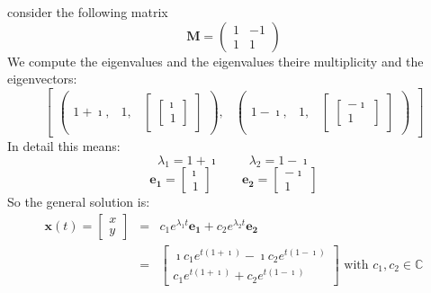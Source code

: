           consider the following matrix 
          \[
 \mathbf{M}=\left(\begin{matrix}1 & -1\\1 & 1\end{matrix}\right)\]          We compute the eigenvalues and the eigenvalues theire multiplicity and the eigenvectors:
          \[
\begin{bmatrix}\begin{pmatrix}1 + \mathbf{\imath}, & 1, & \begin{bmatrix}\left[\begin{smallmatrix}\mathbf{\imath}\\1\end{smallmatrix}\right]\end{bmatrix}\end{pmatrix}, & \begin{pmatrix}1 - \mathbf{\imath}, & 1, & \begin{bmatrix}\left[\begin{smallmatrix}- \mathbf{\imath}\\1\end{smallmatrix}\right]\end{bmatrix}\end{pmatrix}\end{bmatrix}\]          In detail this means:
          \[
\lambda_1=1 + \mathbf{\imath}\hspace{1cm}\lambda_2=1 - \mathbf{\imath}\]\[
\mathbf{e_1}=\left[\begin{smallmatrix}\mathbf{\imath}\\1\end{smallmatrix}\right]\hspace{1cm}\mathbf{e_2}=\left[\begin{smallmatrix}- \mathbf{\imath}\\1\end{smallmatrix}\right]\]          So the general solution is:
\begin{eqnarray}
\mathbf{x}(t)=\left[\begin{smallmatrix}x\\y\end{smallmatrix}\right]&=&c_1 e^{\lambda_1 t}\mathbf{e_1}+c_2 e^{\lambda_2 t}\mathbf{e_2} \nonumber \\&=&\left[\begin{smallmatrix}\mathbf{\imath} c_{1} e^{t \left(1 + \mathbf{\imath}\right)} - \mathbf{\imath} c_{2} e^{t \left(1 - \mathbf{\imath}\right)}\\c_{1} e^{t \left(1 + \mathbf{\imath}\right)} + c_{2} e^{t \left(1 - \mathbf{\imath}\right)}\end{smallmatrix}\right]\text{ with } c_1,c_2 \in \mathbb{C} \nonumber \\\end{eqnarray}

